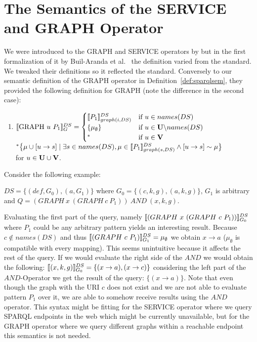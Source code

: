		\section{The Semantics of the SERVICE and GRAPH Operator}
		We were introduced to the GRAPH and
		SERVICE operators by \cite{w3standard}
		but in the first formalization of it by Buil-Aranda et
		al.~\cite{BuilAranda20131} the definition varied from the standard.
		We tweaked their definitions so it reflected the standard.
		Conversely to our semantic definition of the GRAPH operator in 
		Definition~\ref{def:sparqlsem}, they provided the
		following definition for GRAPH (note the difference in the second case):	
				\begin{enumerate}
					\item  $\llbracket \mbox{GRAPH } u \ P_1 \rrbracket_G^{DS}  = \begin{cases} 
							\llbracket P_1\rrbracket_{graph(i,DS)}^{DS} &\mbox{if } u \in names(DS)\\	
							\{ \mu_{\emptyset}\} & \mbox{if } u \in \mathbf{U} \backslash names(DS)\\
							^*
							 & \mbox{if } u \in \mathbf{V}
							\end{cases}$\\
							$^*\big\{\mu \cup [u \rightarrow s ] \mid \exists s \in names(DS), \mu
								\in \llbracket P_1 \rrbracket^{DS}_{graph(s,DS)} \land [ u \rightarrow s ] \sim \mu
							\big\}$\\ for $u \in \mathbf{U} \cup \mathbf{V}$.
					\end{enumerate}

			Consider the following example:
			\begin{example}
				$DS=\{(def,G_0), (a,G_1) \}$ where $G_0 = \{
				(c,k,g), (a,k,g) \}$, $G_1$ is arbitrary and  $Q = (GRAPH \ x  \
				(GRAPH  \ c \  P_1)) \ AND \ (x,k,g)$.
			\end{example}

			Evaluating the first part of the query, namely $\llbracket(GRAPH \ x  \ (GRAPH  \
			c \  P_1))\rrbracket^{DS}_{G_0} $ where $P_1$ could be any arbitrary
			pattern yields an interesting result. Because $c \notin	names(DS)$ 
			and thus $\llbracket (GRAPH \ c  \ P_1) \rrbracket^{DS}_{G_1} = \mu_\emptyset$  we
			obtain $x \rightarrow a$ ($\mu_\emptyset$ is compatible with every
			mapping). This seems unintuitive because it affects the rest of the query.
			If we would evaluate the right side of the $AND$ we would obtain the
			following: $\llbracket(x,k,g)\rrbracket^{DS}_{G_0} = \{ (x \rightarrow a) , (x \rightarrow c) \}$ considering the
			left part of the $AND$-Operator we get the result of the query: $\{ (x \rightarrow a )
			\}$. Note that even though the graph with the URI $c$ does not exist and we are not able
			to evaluate pattern $P_1$ over it, we are able to somehow receive results using
			the $AND$ operator. This syntax might be fitting for the SERVICE
			operator where we query SPARQL endpoints in the web which might be
			currently unavailable, but for the GRAPH operator where we query
			different graphs within a reachable endpoint
			this semantics is not needed.
			\bigskip

